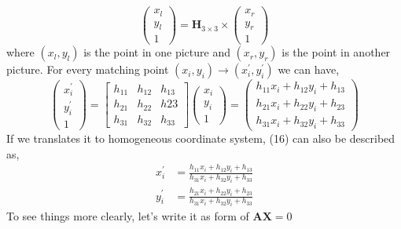 \documentclass[12pt, a4 paper]{article}
\begin{document}
\begin{equation}
    \begin{pmatrix}
        x_{l}\\y_{l}\\1
    \end{pmatrix}=
    \boldsymbol{H}_{3\times 3} \times
    \begin{pmatrix}
        x_{r}\\y_{r}\\1
    \end{pmatrix}
\end{equation}
\indent where $(x_{l},y_{l})$ is the point in one picture and 
$(x_{r}, y_{r})$ is the point in another picture.
For every matching point $(x_{i}, y_{i}) \rightarrow (x_{i}^{\prime},
y_{i}^{\prime})$ we can have,
\begin{equation}
    \begin{pmatrix}
        x_{i}^{\prime} \\ y^{\prime}_{i} \\ 1
    \end{pmatrix} = 
    \begin{bmatrix}
        h_{11} & h_{12} & h_{13}\\
        h_{21} & h_{22} & h{23}\\
        h_{31} & h_{32} & h_{33}
    \end{bmatrix}
    \begin{pmatrix}
        x_{i}\\y_{i}\\1
    \end{pmatrix}=
    \begin{pmatrix}
        h_{11}x_{i} + h_{12}y_{i} + h_{13}\\
        h_{21}x_{i} + h_{22}y_{i} + h_{23}\\
        h_{31}x_{i} + h_{32}y_{i} + h_{33} 
    \end{pmatrix}
\end{equation}
\indent If we translates it to homogeneous coordinate system,
(16) can also be described as,
\begin{align}
    x_{i}^{\prime} &= \frac{h_{11}x_{i} + h_{12}y_{i} + h_{13}}
    {h_{31}x_{i} + h_{32}y_{i} + h_{33}}\\
    y_{i}^{\prime} &= \frac{h_{21}x_{i} + h_{22}y_{i} + h_{23}}
    {h_{31}x_{i} + h_{32}y_{i} + h_{33}}
\end{align}
\indent To see things more clearly, let's write it as form of
$\boldsymbol{A} \boldsymbol{X} = 0$
\end{document}
